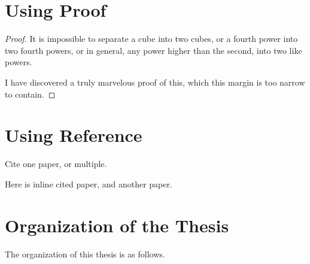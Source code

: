 \section{Using Proof}
\begin{proof}
It is impossible to separate a cube into two cubes, or a fourth power into two fourth powers,
or in general, any power higher than the second, into two like powers.

I have discovered a truly marvelous proof of this, which this margin is too narrow to contain.
\end{proof}

\section{Using Reference}
Cite one paper\cite{r1}, or multiple\cite{r2,r3,r4}.

Here is inline cited paper, and another paper.

\section{Organization of the Thesis}
The organization of this thesis is as follows.
